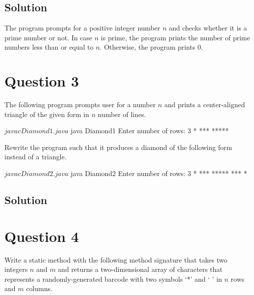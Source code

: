 \documentclass[12pt,letterpaper,twoside]{article}
\begin{document}


\subsection*{Solution}

The program prompts for a positive integer number $n$ and checks whether it is a prime number or not.
In case $n$ is prime, the program prints the number of prime numbers less than or equal to $n$.
Otherwise, the program prints $0$.

\section*{Question 3}

The following program prompts user for a number $n$ and prints a center-aligned triangle of the given form in $n$ number of lines.



\begin{terminal}
$ javac Diamond1.java
$ java Diamond1
Enter number of rows: 3
  *
 ***
*****
\end{terminal}

\newpage

Rewrite the program such that it produces a diamond of the following form instead of a triangle.

\begin{terminal}
$ javac Diamond2.java
$ java Diamond2
Enter number of rows: 3
  *
 ***
*****
 ***
  *
\end{terminal}

\subsection*{Solution}



\section*{Question 4}

Write a static method with the following method signature that takes two integers $n$ and $m$ and returns a two-dimensional array of characters that represents a randomly-generated barcode with two symbols `*' and ` ' in $n$ rows and $m$ columns.
\end{document}
